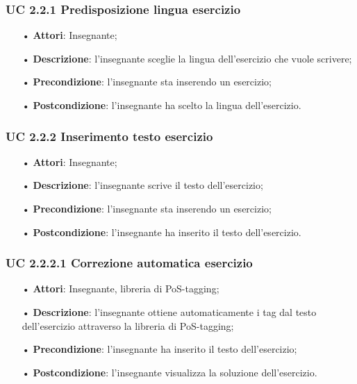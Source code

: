 \subsubsection{UC 2.2.1 Predisposizione lingua esercizio}
\begin{itemize}
	\item[•] \textbf{Attori}: Insegnante;
	\item[•] \textbf{Descrizione}: l'insegnante sceglie la lingua dell’esercizio che vuole scrivere;
	\item[•] \textbf{Precondizione}: l'insegnante sta inserendo un esercizio;
	\item[•] \textbf{Postcondizione}: l'insegnante ha scelto la lingua dell'esercizio.
\end{itemize}
\subsubsection{UC 2.2.2 Inserimento testo esercizio}

\begin{itemize}
	\item[•] \textbf{Attori}: Insegnante;
	\item[•] \textbf{Descrizione}: l'insegnante scrive il testo dell’esercizio;
	\item[•] \textbf{Precondizione}: l'insegnante sta inserendo un esercizio;
	\item[•] \textbf{Postcondizione}: l'insegnante ha inserito il testo dell'esercizio.
\end{itemize}

\subsubsection{UC 2.2.2.1 Correzione automatica esercizio}
\begin{itemize}
	\item[•] \textbf{Attori}: Insegnante, libreria di PoS-tagging;
	\item[•] \textbf{Descrizione}: l’insegnante ottiene automaticamente i tag dal testo dell’esercizio attraverso la libreria di PoS-tagging;
	\item[•] \textbf{Precondizione}: l'insegnante ha inserito il testo dell'esercizio;
	\item[•] \textbf{Postcondizione}: l'insegnante visualizza la soluzione dell'esercizio.
\end{itemize}

